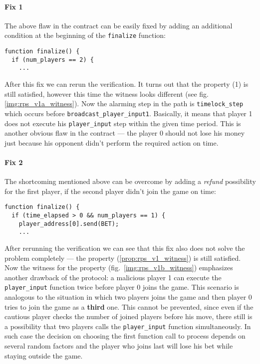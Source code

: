 \paragraph{Fix 1} 

The above flaw in the contract can be easily fixed by adding an additional condition at the beginning of the 
\lstinline{finalize} function:
\begin{lstlisting}
function finalize() {
  if (num_players == 2) {
    ...
\end{lstlisting}

After this fix we can rerun the verification.
It turns out that the property (1) is still satisfied, however this
time the witness looks different (see fig. \ref{img:rps_v1a_witness}).
Now the alarming step in the path is \lstinline{timelock_step} which occurs before \lstinline{broadcast_player_input1}.
Basically, it means that player 1 does not execute his \lstinline{player_input} step within the given time period.
This is another obvious flaw in the contract --- the player 0 should not lose his money just because his opponent
didn't perform the required action on time.

\paragraph{Fix 2}

The shortcoming mentioned above can be overcome by adding a \emph{refund} possibility for the first player, if the second player
didn't join the game on time:
\begin{lstlisting}
function finalize() {
  if (time_elapsed > 0 && num_players == 1) {
    player_address[0].send(BET);
    ...
\end{lstlisting}

After rerunning the verification we can see that this fix also does not solve the problem completely --- the property 
(\ref{prop:rps_v1_witness}) is still satisfied.
Now the witness for the property (fig.\ \ref{img:rps_v1b_witness}) emphasizes another drawback of the protocol:
a malicious player 1 can execute the \lstinline{player_input} function twice before player 0 joins the game.
This scenario is analogous to the situation in which two players joins the game and then player 0 tries to join
the game as a \textbf{third} one.
This cannot be prevented, since even if the cautious player checks the number of joined players before his move,
there still is a possibility that two players calls the \lstinline{player_input} function simultaneously.
In such case the decision on choosing the first function call to process depends on several random factors and the player
who joins last will lose his bet while staying outside the game.

